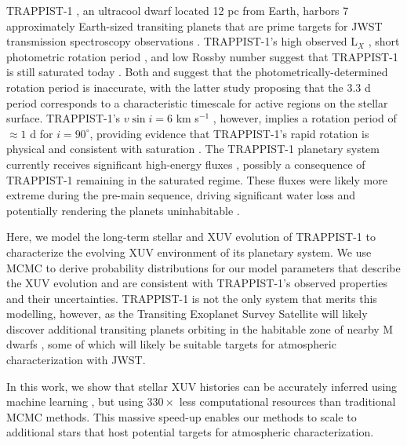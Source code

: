 \documentclass[twocolumn]{aastex62}
\def\lsim{~\rlap{$<$}{\lower 1.0ex\hbox{$\sim$}}}
\newcommand{\approxposterior}[0]{\texttt{approxposterior}\xspace}
\begin{document}
TRAPPIST-1 \citep{Gillon2016,Gillon2017}, an ultracool dwarf located 12 pc from Earth, harbors 7 approximately Earth-sized transiting planets that are prime targets for JWST transmission spectroscopy observations \citep{Morley2017,Lincowski2018,Lustig2019}. TRAPPIST-1's high observed L$_{X}$ \citep{Wheatley2017}, short photometric rotation period \citep[3.3 d, ][]{Luger2017}, and low Rossby number \citep[Ro $\approx 0.01$, ][]{Roettenbacher2017} suggest that TRAPPIST-1 is still saturated today \citep{Pizzolato2003,Wright2011,Wright2018}. Both \citet{Roettenbacher2017} and \citet{Morris2018} suggest that the photometrically-determined rotation period is inaccurate, with the latter study proposing that the 3.3 d period corresponds to a characteristic timescale for active regions on the stellar surface. TRAPPIST-1's $v \sin i = 6$ km s$^{-1}$ \citep{Barnes2014}, however, implies a rotation period of $\approx 1$ d for $i = 90^{\circ}$, providing evidence that TRAPPIST-1's rapid rotation is physical and consistent with saturation \citep[$P_{rot} \lsim 20$ d,][]{Wright2018}. The TRAPPIST-1 planetary system currently receives significant high-energy fluxes \citep{Bourrier2017b,Wheatley2017,Peacock2019}, possibly a consequence of TRAPPIST-1 remaining in the saturated regime. These fluxes were likely more extreme during the pre-main sequence, driving significant water loss and potentially rendering the planets uninhabitable \citep{Bolmont2017,Bourrier2017a}. 

Here, we model the long-term stellar and XUV evolution of TRAPPIST-1 to characterize the evolving XUV environment of its planetary system. We use MCMC to derive probability distributions for our model parameters that describe the XUV evolution and are consistent with TRAPPIST-1's observed properties and their uncertainties. TRAPPIST-1 is not the only system that merits this modelling, however, as the Transiting Exoplanet Survey Satellite will likely discover additional transiting planets orbiting in the habitable zone of nearby M dwarfs \citep{Barclay2018}, some of which will likely be suitable targets for atmospheric characterization with JWST. 

In this work, we show that stellar XUV histories can be accurately inferred using machine learning \citep[\approxposterior, ][]{FlemingVanderPlas2018}, but using $330\times$ less computational resources than traditional MCMC methods. This massive speed-up enables our methods to scale to additional stars that host potential targets for atmospheric characterization. 
\end{document}
